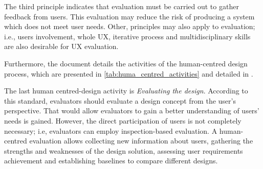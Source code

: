 The third principle indicates that evaluation must be carried out to gather feedback from users. This evaluation may reduce the risk of producing a system which does not meet user needs. Other, principles may also apply to evaluation; i.e., users involvement, whole \ac{UX}, iterative process and multidisciplinary skills are also desirable for \ac{UX} evaluation.

Furthermore, the document details the activities of the human-centred design process, which are presented in \autoref{tab:huma_centred_activities} and detailed in \autocite{iso25060}.

\begin{table}[htb]
\caption[Activities of the human-centred design process]{Activities of the human-centred design process}
\label{tab:huma_centred_activities}
\myfloatalign
{}
\end{table}

The last human centred-design activity is \textit{Evaluating the design}. According to this standard, evaluators should evaluate a design concept from the user's perspective. That would allow evaluators to gain a better understanding of users' needs is gained. However, the direct participation of users is not completely necessary; i.e, evaluators can employ inspection-based evaluation. A human-centred evaluation allows collecting new information about users, gathering the strengths and weaknesses of the design solution, assessing user requirements achievement and establishing baselines to compare different designs.

